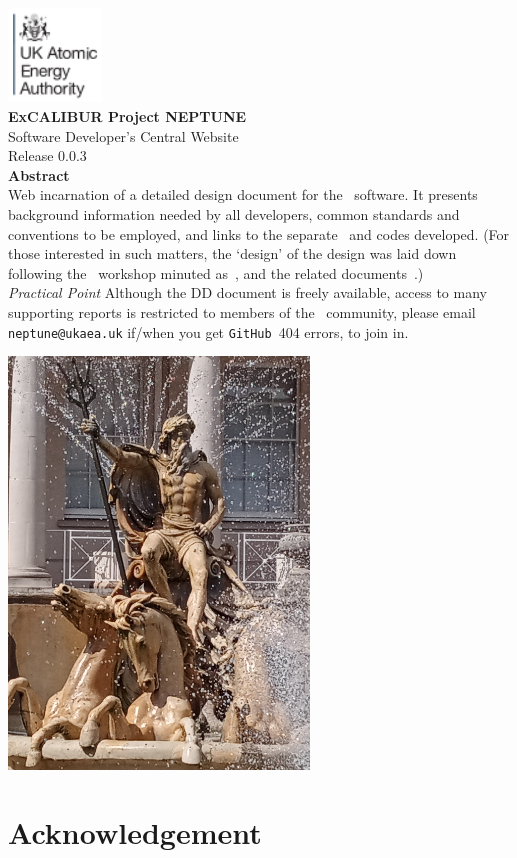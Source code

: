 \documentclass[11pt,twoside,a4paper]{report}
\newcommand{\culhamtitle}{\LARGE Software Developer's Central Website  \\[1.0\baselineskip] Release 0.0.3}%
\begin{document}
\vspace*{-30mm}
\includegraphics[width=2.5cm]{./corpics/cofaplus.png} \\[2.0\baselineskip]
{\LARGE {\textbf{\textsf{ExCALIBUR Project NEPTUNE}}}\\[2.0\baselineskip]}
{\LARGE \culhamtitle } \\[2.0\baselineskip]
{\textbf{\textsf{Abstract}}}\\
Web incarnation of a detailed design document for the \nep \ software.
It presents background information needed by all developers, common
standards and conventions to be employed, and links to the separate
\papp \ and codes developed.
(For those interested in such matters, the `design' of the design
was laid down following the \nep \ workshop minuted as~\cite{y3re181},
and the related documents~\cite{y2d34,y3re314}.)\\
\emph{Practical Point} Although the DD document is freely available,
access to many supporting reports is restricted to members of the \nep \
community, please email {\tt neptune@ukaea.uk} if/when you get
{\tt GitHub}~404 errors, to join in.
\vfill
\centerline{\includegraphics[width=8cm]{./png/neptune.png}}
\tableofcontents
\clearpage

\clearpage
\chapter*{Acknowledgement}\label{sec:ackn}


%
%
\printbibliography
\end{document}
